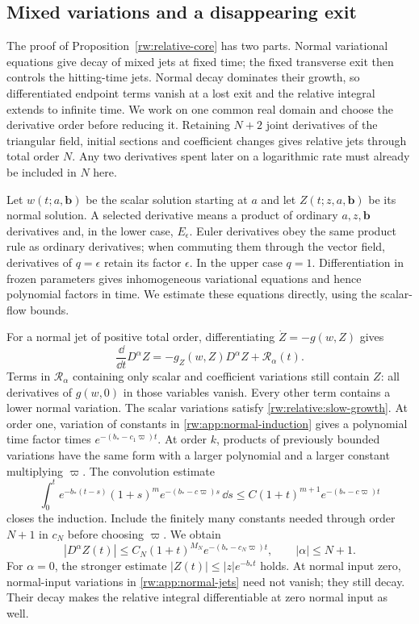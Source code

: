 \subsection{Mixed variations and a disappearing exit}
\label{rw:app:relative-variations}

The proof of Proposition~\ref{rw:relative-core} has two parts.  Normal
variational equations give decay of mixed jets at fixed time; the
fixed transverse exit then controls the hitting-time jets.  Normal
decay dominates their growth, so differentiated endpoint terms vanish
at a lost exit and the relative integral extends to infinite time.
We work on one common real domain and choose the derivative order
before reducing it.  Retaining $N+2$ joint derivatives of the
triangular field, initial sections and coefficient changes gives
relative jets through total order $N$.  Any two derivatives spent
later on a logarithmic rate must already be included in $N$ here.

Let $w(t;a,\mathbf b)$ be the scalar solution starting at $a$ and
let $Z(t;z,a,\mathbf b)$ be its normal solution. A selected derivative
means a product of ordinary $a,z,\mathbf b$ derivatives and, in the
lower case, $E_\epsilon$. Euler derivatives obey the same product
rule as ordinary derivatives; when commuting them through the vector
field, derivatives of $q=\epsilon$ retain its factor $\epsilon$.
In the upper case $q=1$.  Differentiation in frozen parameters gives
inhomogeneous variational equations and hence polynomial factors in
time.  We estimate these equations directly, using the scalar-flow
bounds.

For a normal jet of positive total order, differentiating
$\dot Z=-g(w,Z)$ gives
\begin{equation}\label{rw:app:normal-induction}
 \frac{\dd}{\dd t}D^\alpha Z
 =-g_Z(w,Z)D^\alpha Z+\mathcal R_\alpha(t).
\end{equation}
Terms in $\mathcal R_\alpha$ containing only scalar and coefficient
variations still contain $Z$: all derivatives of $g(w,0)$ in those
variables vanish. Every other term contains a lower normal variation.
The scalar variations satisfy
\eqref{rw:relative:slow-growth}. At order one, variation of constants
in \eqref{rw:app:normal-induction} gives a polynomial time factor
times $e^{-(b_*-c_1\varpi)t}$. At order $k$, products of previously
bounded variations have the same form with a larger polynomial and
a larger constant multiplying $\varpi$. The convolution estimate
\[
 \int_0^t e^{-b_*(t-s)}(1+s)^m
                 e^{-(b_*-c\varpi)s}\,\dd s
 \le C(1+t)^{m+1}e^{-(b_*-c\varpi)t}
\]
closes the induction. Include the finitely many constants needed
through order $N+1$ in $c_N$ before choosing $\varpi$. We obtain
\begin{equation}\label{rw:app:normal-jets}
 |D^\alpha Z(t)|\le
 C_N(1+t)^{M_N}e^{-(b_*-c_N\varpi)t},\qquad |\alpha|\le N+1.
\end{equation}
For $\alpha=0$, the stronger estimate
$|Z(t)|\le|z|e^{-b_*t}$ holds. At normal input zero, normal-input
variations in \eqref{rw:app:normal-jets} need not vanish; they still
decay.  Their decay makes the relative integral differentiable at zero
normal input as well.

